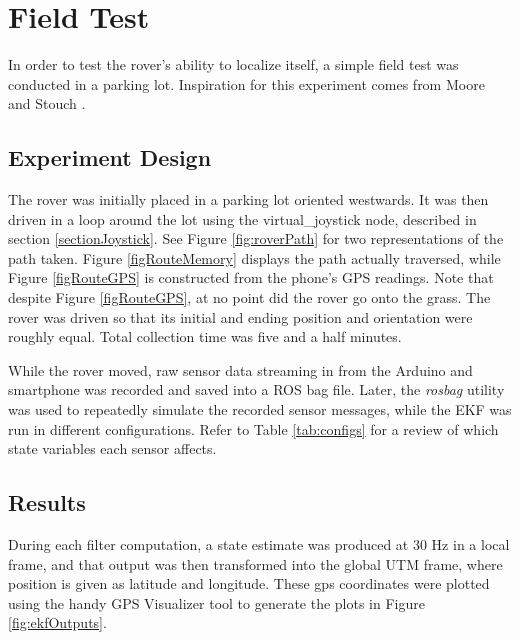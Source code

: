 \chapter{Field Test}

In order to test the rover's ability to localize itself, a simple field test was conducted in a parking lot. Inspiration for this experiment comes from Moore and Stouch \cite{robot_localization_paper}.

\section{Experiment Design}

The rover was initially placed in a parking lot oriented westwards. It was then driven in a loop around the lot using the virtual\_joystick node, described in section \ref{sectionJoystick}. See Figure \ref{fig:roverPath} for two representations of the path taken. Figure \ref{figRouteMemory} displays the path actually traversed, while Figure \ref{figRouteGPS} is constructed from the phone's GPS readings. Note that despite Figure \ref{figRouteGPS}, at no point did the rover go onto the grass. The rover was driven so that its initial and ending position and orientation were roughly equal. Total collection time was five and a half minutes.

While the rover moved, raw sensor data streaming in from the Arduino and smartphone was recorded and saved into a ROS bag file.  Later, the \textit{rosbag} utility was used to repeatedly simulate the recorded sensor messages, while the EKF was run in different configurations. Refer to Table \ref{tab:configs} for a review of which state variables each sensor affects.

\section{Results}


During each filter computation, a state estimate was produced at 30 Hz in a local frame, and that output was then transformed into the global UTM frame, where position is given as latitude and longitude. These gps coordinates were plotted using the handy GPS Visualizer tool \cite{gps_visualizer} to generate the plots in  Figure \ref{fig:ekfOutputs}.

